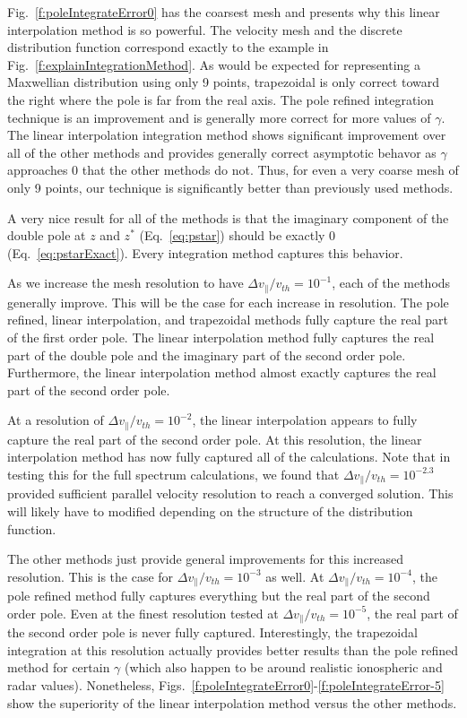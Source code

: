 Fig.~\ref{f:poleIntegrateError0} has the coarsest mesh and presents why this linear interpolation method is so powerful.
The velocity mesh and the discrete distribution function correspond exactly to the example in Fig.~\ref{f:explainIntegrationMethod}.
As would be expected for representing a Maxwellian distribution using only 9 points, trapezoidal is only correct toward the right where the pole is far from the real axis.
The pole refined integration technique is an improvement and is generally more correct for more values of $\gamma$.
The linear interpolation integration method shows significant improvement over all of the other methods and provides generally correct asymptotic behavor as $\gamma$ approaches 0 that the other methods do not.
Thus, for even a very coarse mesh of only 9 points, our technique is significantly better than previously used methods.


A very nice result for all of the methods is that the imaginary component of the double pole at $z$ and $z^*$ (Eq.~\ref{eq:pstar}) should be exactly 0 (Eq.~\ref{eq:pstarExact}).
Every integration method captures this behavior.


As we increase the mesh resolution to have $\Delta v_\parallel/v_{th}=10^{-1}$, each of the methods generally improve.
This will be the case for each increase in resolution.
The pole refined, linear interpolation, and trapezoidal methods fully capture the real part of the first order pole. 
The linear interpolation method fully captures the real part of the double pole and the imaginary part of the second order pole.
Furthermore, the linear interpolation method almost exactly captures the real part of the second order pole.


At a resolution of $\Delta v_\parallel/v_{th}=10^{-2}$, the linear interpolation appears to fully capture the real part of the second order pole.
At this resolution, the linear interpolation method has now fully captured all of the calculations. 
Note that in testing this for the full spectrum calculations, we found that $\Delta v_\parallel/v_{th}=10^{-2.3}$ provided sufficient parallel velocity resolution to reach a converged solution. 
This will likely have to modified depending on the structure of the distribution function.

The other methods just provide general improvements for this increased resolution. 
This is the case for $\Delta v_\parallel/v_{th}=10^{-3}$ as well.
At $\Delta v_\parallel/v_{th}=10^{-4}$, the pole refined method fully captures everything but the real part of the second order pole.
Even at the finest resolution tested at $\Delta v_\parallel/v_{th}=10^{-5}$, the real part of the second order pole is never fully captured.
Interestingly, the trapezoidal integration at this resolution actually provides better results than the pole refined method for certain $\gamma$ (which also happen to be around realistic ionospheric and radar values).
Nonetheless, Figs.~\ref{f:poleIntegrateError0}-\ref{f:poleIntegrateError-5} show the superiority of the linear interpolation method versus the other methods.

